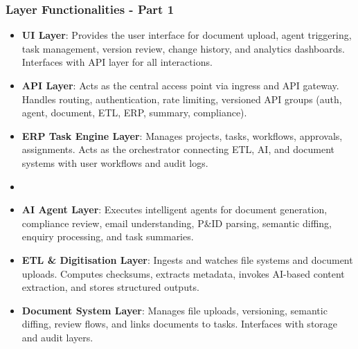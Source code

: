 \begin{frame}
  \frametitle{Layer Functionalities - Part 1}
  \begin{itemize}
    \item \textbf{UI Layer}: Provides the user interface for document upload, agent triggering, task management, version review, change history, and analytics dashboards. Interfaces with API layer for all interactions.
    \item \textbf{API Layer}: Acts as the central access point via ingress and API gateway. Handles routing, authentication, rate limiting, versioned API groups (auth, agent, document, ETL, ERP, summary, compliance).
    \item \textbf{ERP Task Engine Layer}: Manages projects, tasks, workflows, approvals, assignments. Acts as the orchestrator connecting ETL, AI, and document systems with user workflows and audit logs.
    \item \item \textbf{AI Agent Layer}: Executes intelligent agents for document generation, compliance review, email understanding, P\&ID parsing, semantic diffing, enquiry processing, and task summaries.
    \item \textbf{ETL \& Digitisation Layer}: Ingests and watches file systems and document uploads. Computes checksums, extracts metadata, invokes AI-based content extraction, and stores structured outputs.
    \item \textbf{Document System Layer}: Manages file uploads, versioning, semantic diffing, review flows, and links documents to tasks. Interfaces with storage and audit layers.
  \end{itemize}
\end{frame}



